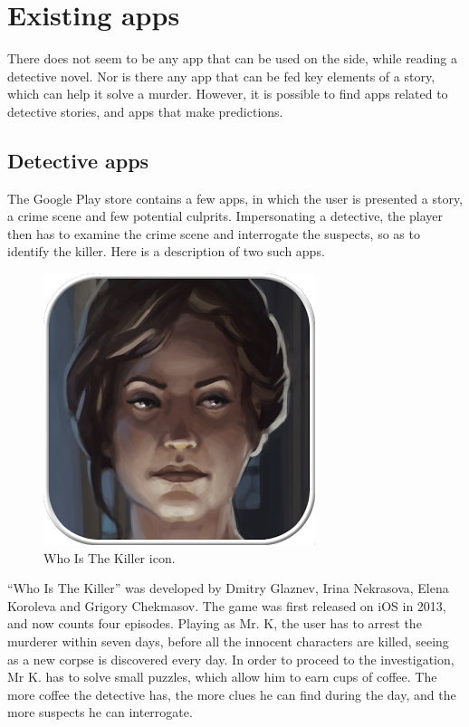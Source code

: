 \documentclass{mproj}
\begin{document}
\section{Existing apps}

There does not seem to be any app that can be used on the side, while reading a detective novel. Nor is there any app that can be fed key elements of a story, which can help it solve a murder. However, it is possible to find apps related to detective stories, and apps that make predictions.

\subsection{Detective apps}

The Google Play store contains a few apps, in which the user is presented a story, a crime scene and few potential culprits. Impersonating a detective, the player then has to examine the crime scene and interrogate the suspects, so as to identify the killer. Here is a description of two such apps. \par

\begin{figure}
	\vspace{-10pt}
	\centering
	\includegraphics[scale=0.25]{images/whoisthekiller_icon}
	\caption{Who Is The Killer icon.}
	\vspace{-25pt}
\end{figure}

``Who Is The Killer'' \cite{whoisthekiller} was developed by Dmitry Glaznev, Irina Nekrasova, Elena Koroleva and Grigory Chekmasov. The game was first released on iOS in 2013, and now counts four episodes. Playing as Mr. K, the user has to arrest the murderer within seven days, before all the innocent characters are killed, seeing as a new corpse is discovered every day. In order to proceed to the investigation, Mr K. has to solve small puzzles, which allow him to earn cups of coffee. The more coffee the detective has, the more clues he can find during the day, and the more suspects he can interrogate. \par
\end{document}
